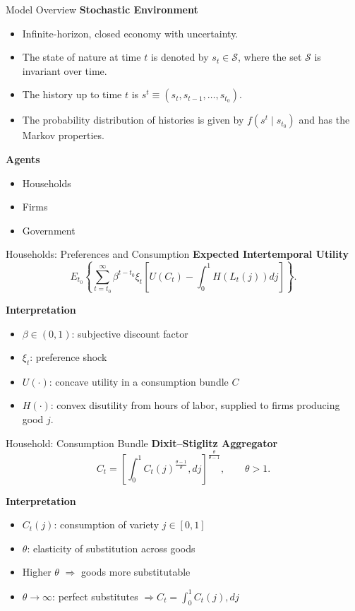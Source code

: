 \documentclass[11pt,aspectratio=169]{beamer}
\newcommand{\mc}[1]{\mathcal{#1}}
\begin{document}
\begin{frame}{Model Overview}
\small
\textbf{Stochastic Environment}
\begin{itemize}
  \item Infinite-horizon, closed economy with uncertainty.
  \item The state of nature at time $t$ is denoted by $s_t \in \mc{S}$, where the set $\mc{S}$ is invariant over time.
  \item The history up to time $t$ is $s^{t} \equiv (s_t, s_{t-1}, \dots, s_{t_0})$.
  \item The probability distribution of histories is given by $f(s^{t}\mid s_{t_0})$ and has the Markov properties.
\end{itemize}

\textbf{Agents}
\begin{itemize}
  \item Households
  \item Firms
  \item Government
\end{itemize}
\end{frame}

\begin{frame}{Households: Preferences and Consumption}
\small
\textbf{Expected Intertemporal Utility}
\begin{equation}
E_{t_{0}}\left\{ \sum_{t=t_{0}}^{\infty }\beta ^{t-t_{0}}\xi _{t}\left[
U(C_{t})-\int_{0}^{1}H(L_{t}(j))dj\right] \right\}.  \label{UtilityNK}
\end{equation}

\textbf{Interpretation}
\begin{itemize}
\item $\beta \in (0,1)$: subjective discount factor
\item $\xi_t$: preference shock
\item $U(\cdot)$: concave utility in a consumption bundle $C$
\item $H(\cdot)$: convex disutility from hours of labor, supplied to firms producing good $j$. 
\end{itemize}
\end{frame}
\begin{frame}{Household: Consumption Bundle}
\small
\textbf{Dixit–Stiglitz Aggregator}
\begin{equation}
C_{t}=\left[ \int_{0}^{1} C_{t}(j)^{\frac{\theta -1}{\theta}}, dj \right]^{\frac{\theta}{\theta -1}},
\qquad \theta > 1.
\label{DSaggregator}
\end{equation}

\textbf{Interpretation}
\begin{itemize}
\item $C_t(j)$: consumption of variety $j \in [0,1]$
\item $\theta$: elasticity of substitution across goods
\item Higher $\theta$ $\Rightarrow$ goods more substitutable
\item $\theta \to \infty$: perfect substitutes $\Rightarrow C_t = \int_0^1 C_t(j), dj$
\end{itemize}
\end{frame}
\end{document}
